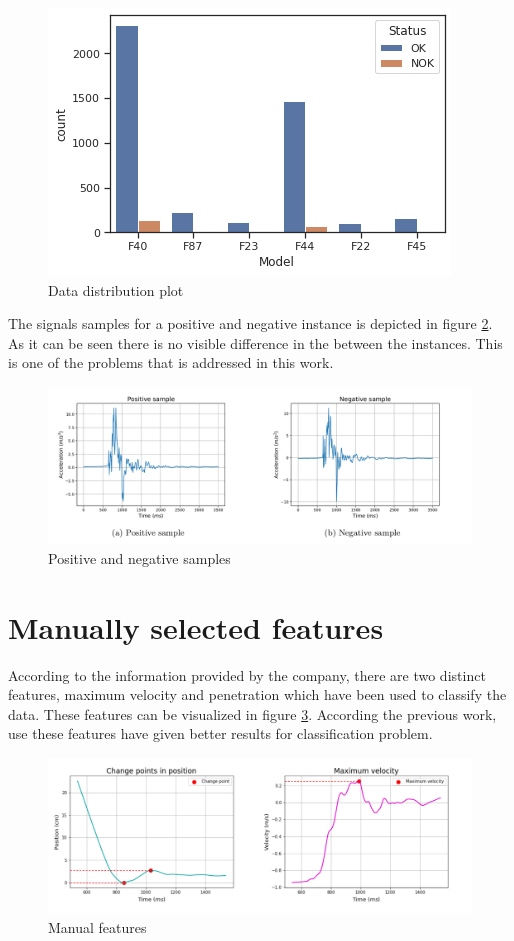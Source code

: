      \begin{figure}[h]
     	\centering
     	\includegraphics[width=0.6\linewidth]{images/barplot1.png}
     	\caption{Data distribution plot}
     	\label{n4}
     \end{figure}
   
    The signals samples for a positive and negative instance is depicted in figure \ref{n5}. As it can be seen there is no visible difference in the between the instances. This is one of the problems that is addressed in this work.
    
     \begin{figure}[h]
      	\centering
      	\includegraphics[width=1\linewidth]{images/posneg.png}
      	\caption{Positive and negative samples}
      	\label{n5}
      \end{figure}
      
      
    \section{Manually selected features}
    According to the information provided by the company, there are two distinct features, maximum velocity and penetration which have been used to classify the data. These features can be visualized in figure \ref{n7}. According the previous work, use these features have given better results for classification problem.
    
       \begin{figure}[h]
       	\centering
       	\includegraphics[width=1\linewidth]{images/signal2.png}
       	\caption{Manual features}
       	\label{n7}
       \end{figure}
       
